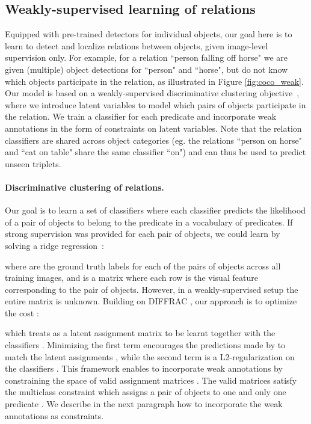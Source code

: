\documentclass[10pt,twocolumn,letterpaper]{article}
\newcommand{\spaceparagraph}{\vspace{-.35cm}}
\begin{document}
\subsection{Weakly-supervised learning of relations}
\label{model}

Equipped with pre-trained detectors for individual objects, our goal here is to learn to detect and localize relations between objects, given image-level supervision only. For example, for a relation ``person falling off horse" we are given (multiple) object detections for ``person" and ``horse", but do not know which objects participate in the relation, as illustrated in Figure \ref{fig:coco_weak}. Our model is based on a weakly-supervised discriminative clustering objective~\cite{bach2008diffrac}, where we introduce latent variables to model which pairs of objects participate in the relation. We train a classifier for each predicate  and incorporate weak annotations in the form of constraints on latent variables. Note that the relation classifiers are shared across object categories (eg. the relations ``person on horse" and ``cat on table" share the same classifier ``on") and can thus be used to predict unseen triplets.

\spaceparagraph
\paragraph{Discriminative clustering of relations.}
Our goal is to learn a set of classifiers  where each classifier  predicts the likelihood of a pair of objects  to belong to the  predicate in a vocabulary of  predicates. If strong supervision was provided for each pair of objects, we could learn  by solving a ridge regression~:
\vspace{-0.5cm}

where  are the ground truth labels for each of the  pairs of objects across all training images, and  is a  matrix where each row  is the visual feature corresponding to the  pair of objects. However, in a weakly-supervised setup the entire matrix  is unknown. Building on DIFFRAC \cite{bach2008diffrac}, our approach is to optimize the cost : 
\vspace{-0.2cm}

\noindent which treats  as a latent assignment matrix to be learnt together with the classifiers . Minimizing the first term encourages the predictions made by  to match the latent assignments , while the second term is a L2-regularization on the classifiers . This framework enables to incorporate weak annotations by constraining the space of valid assignment matrices . The valid matrices  satisfy the multiclass constraint  which assigns a pair of objects to one and only one predicate . We describe in the next paragraph how to incorporate the weak annotations as constraints. 
\end{document}
